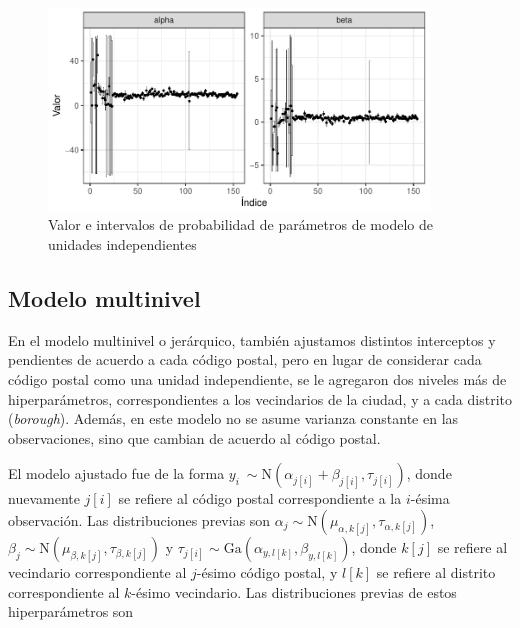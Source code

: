 \begin{figure}[H]
    \centering
    \includegraphics[width=0.9\textwidth]{images/no_pooling_param_values.pdf}
    \caption{Valor e intervalos de probabilidad de parámetros de modelo de unidades independientes}
    \label{fig:no_pooling_param_values}
\end{figure}


\subsection{Modelo multinivel}

En el modelo multinivel o jerárquico, también ajustamos distintos interceptos y pendientes de acuerdo a cada código postal, pero en lugar de considerar cada código postal como una unidad independiente, se le agregaron dos niveles más de hiperparámetros, correspondientes a los vecindarios de la ciudad, y a cada distrito (\textit{borough}). Además, en este modelo no se asume varianza constante en las observaciones, sino que cambian de acuerdo al código postal.

El modelo ajustado fue de la forma $y_i ~ \sim \mathrm{N}(\alpha_{j[i]} + \beta_{j[i]}, \tau_{j[i]})$, donde nuevamente $j[i]$ se refiere al código postal correspondiente a la $i$-ésima observación. Las distribuciones previas son $\alpha_j \sim \mathrm{N} (\mu_{\alpha, k[j]}, \tau_{\alpha, k[j]})$, $\beta_j \sim \mathrm{N} (\mu_{\beta, k[j]}, \tau_{\beta, k[j]})$ y $\tau_{j[i]} \sim \mathrm{Ga}(\alpha_{y, l[k]}, \beta_{y, l[k]})$, donde $k[j]$ se refiere al vecindario correspondiente al $j$-ésimo código postal, y $l[k]$ se refiere al distrito correspondiente al $k$-ésimo vecindario. Las distribuciones previas de estos hiperparámetros son 

